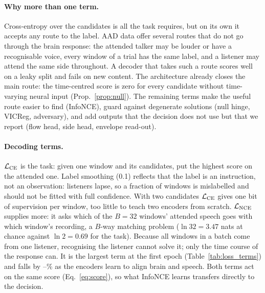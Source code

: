 \documentclass[10pt,twocolumn,letterpaper]{article}
\begin{document}
\paragraph{Why more than one term.} Cross-entropy over the candidates is all the task
requires, but on its own it accepts any route to the label. AAD data offer several routes
that do not go through the brain response: the attended talker may be louder or have a
recognisable voice, every window of a trial has the same label, and a listener may attend the
same side throughout. A decoder that takes such a route scores well on a leaky split and
fails on new content. The architecture already closes the main route: the time-centred
score is zero for every candidate without time-varying neural input (Prop.~\ref{prop:null}).
The remaining terms make the useful route easier to find (InfoNCE), guard against
degenerate solutions (null hinge, VICReg, adversary), and add outputs that the decision does
not use but that we report (flow head, side head, envelope read-out).

\paragraph{Decoding terms.} $\mathcal L_{\rm CE}$ is the task: given one window and its
candidates, put the highest score on the attended one. Label smoothing (0.1) reflects that
the label is an instruction, not an observation: listeners lapse, so a fraction of windows
is mislabelled and should not be fitted with full confidence. With two candidates
$\mathcal L_{\rm CE}$ gives one bit of supervision per window, too little to teach two
encoders from scratch. $\mathcal L_{\rm NCE}$ supplies more: it asks which of the $B=32$
windows' attended speech goes with which window's recording, a $B$-way matching problem
($\ln 32=3.47$ nats at chance against $\ln 2=0.69$ for the task). Because all windows in a
batch come from one listener, recognising the listener cannot solve it; only the time
course of the response can. It is the largest term at the first epoch
(Table~\ref{tab:loss_terms}) and falls by \nceDropMin--\nceDropMax\% as the encoders learn to align
brain and speech. Both terms act on the same score (Eq.~\ref{eq:score}), so what InfoNCE
learns transfers directly to the decision.
\end{document}
